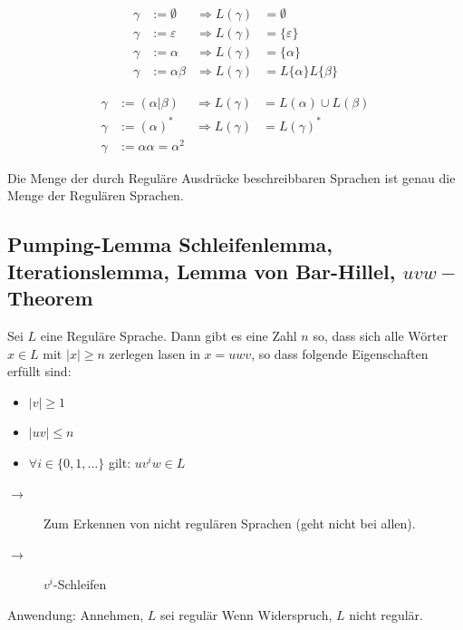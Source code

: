 \documentclass{scrartcl}
\begin{document}
\begin{minipage}[t]{0.48\textwidth}
    \begin{align*}
        \gamma &:= \emptyset & \Rightarrow L(\gamma) &= \emptyset \\
        \gamma &:=\varepsilon & \Rightarrow L(\gamma) &= \{\varepsilon\} \\
        \gamma &:=\alpha & \Rightarrow L(\gamma) &= \{\alpha\} \\
        \gamma &:=\alpha\beta & \Rightarrow L(\gamma) &= L\{\alpha\}L\{\beta\}
    \end{align*}
\end{minipage}
\hfill \vrule \hfill
\begin{minipage}[t]{0.48\textwidth}
    \begin{align*}
        \gamma &:= \left(\alpha\vert\beta\right) & \Rightarrow L\left(\gamma\right)&=L(\alpha)\cup L(\beta) \\
        \gamma &:= \left(\alpha\right)^* & \Rightarrow L(\gamma) &= L(\gamma)^* \\
        \gamma &:= \alpha\alpha = \alpha^2
    \end{align*}
\end{minipage}

\begin{shaded}
    Die Menge der durch Reguläre Ausdrücke beschreibbaren Sprachen ist genau die Menge der Regulären Sprachen.
\end{shaded}

\subsection*{Pumping-Lemma {\tiny Schleifenlemma, Iterationslemma, Lemma von Bar-Hillel, $uvw-$Theorem}} %
\begin{shaded}
    Sei $L$ eine Reguläre Sprache. Dann gibt es eine Zahl $n$ so, dass sich alle Wörter $x\in L$ mit $|x|\geq n$ zerlegen lasen in $x=uwv$, so dass folgende Eigenschaften erfüllt sind:
    \begin{itemize}
        \item $|v|\geq1$
        \item $|uv|\leq n$
        \item $\forall i\in\{0,1,\dots\}$ gilt: $uv^iw\in L$
    \end{itemize}
\end{shaded}
\begin{description}
    \item[$\to$] Zum Erkennen von nicht regulären Sprachen (geht nicht bei allen).
    \item[$\to$] $v^i$-Schleifen
\end{description}
Anwendung: Annehmen, $L$ sei regulär \follows Wenn Widerspruch, $L$ nicht regulär.
\end{document}
